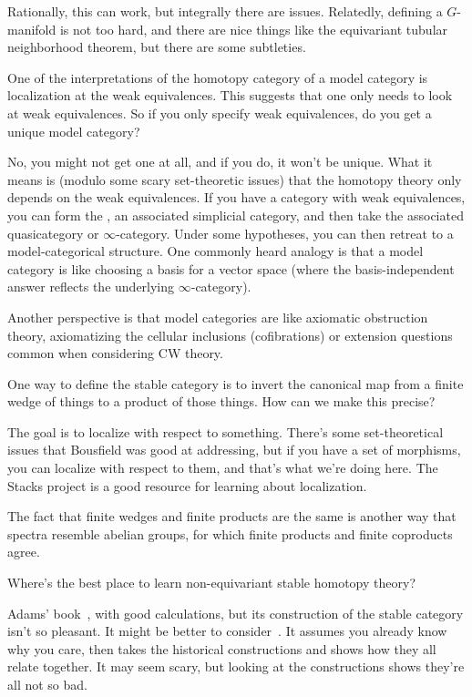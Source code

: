 Rationally, this can work, but integrally there are issues. Relatedly, defining a $G$-manifold is not too hard, and
there are nice things like the equivariant tubular neighborhood theorem, but there are some subtleties.
\begin{ques}
One of the interpretations of the homotopy category of a model category is localization at the weak equivalences.
This suggests that one only needs to look at weak equivalences. So if you only specify weak equivalences, do you
get a unique model category?
\end{ques}
No, you might not get one at all, and if you do, it won't be unique. What it means is (modulo some scary
set-theoretic issues) that the homotopy theory only depends on the weak equivalences. If you have a category with
weak equivalences, you can form the , an associated simplicial category, and then take
the associated quasicategory or $\infty$-category. Under some hypotheses, you can then retreat to a
model-categorical structure. One commonly heard analogy is that a model category is like choosing a basis for a
vector space (where the basis-independent answer reflects the underlying $\infty$-category).

Another perspective is that model categories are like axiomatic obstruction theory, axiomatizing the cellular
inclusions (cofibrations) or extension questions common when considering CW theory.
\begin{ques}
One way to define the stable category is to invert the canonical map from a finite wedge of things to a product of
those things. How can we make this precise?
\end{ques}
The goal is to localize with respect to something. There's some set-theoretical issues that Bousfield was good at
addressing, but if you have a set of morphisms, you can localize with respect to them, and that's what we're doing
here. The Stacks project is a good resource for learning about localization.

The fact that finite wedges and finite products are the same is another way that spectra resemble abelian groups,
for which finite products and finite coproducts agree.
\begin{ques}
Where's the best place to learn non-equivariant stable homotopy theory?
\end{ques}
Adams' book~\cite{AdamsStableHomotopy}, with good calculations, but its construction of the stable category isn't
so pleasant. It might be better to consider~\cite{MMSS}. It assumes you already know why you care, then takes the
historical constructions and shows how they all relate together. It may seem scary, but looking at the
constructions shows they're all not so bad.

